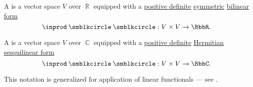 \begin{definition}\label{def:inner_product_space}\mimprovised
  A  is a vector space \( V \) over \( \BbbR \) equipped with a \hyperref[def:quadratic_form_definiteness/positive_definite]{positive definite} \hyperref[def:symmetric_function]{symmetric} \hyperref[def:bilinear_form]{bilinear form}
  \begin{equation*}
    \inprod \anon \anon: V \times V \to \BbbR.
  \end{equation*}

  A  is a vector space \( V \) over \( \BbbC \) equipped with a \hyperref[def:quadratic_form_definiteness/positive_definite]{positive definite} \hyperref[def:hermitian_form]{Hermitian} \hyperref[def:sesquilinear_form]{sesquilinear form}
  \begin{equation*}
    \inprod \anon \anon: V \times V \to \BbbC.
  \end{equation*}

  This notation is generalized for application of linear functionals --- see .
\end{definition}


